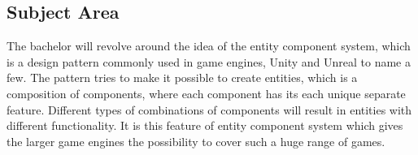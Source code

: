 \subsection{Subject Area}
The bachelor will revolve around the idea of the entity component system, which is a design pattern commonly used in game engines, Unity and Unreal to name a few. 
The pattern tries to make it possible to create entities, which is a composition of components, where each component has its each unique separate feature. 
Different types of combinations of components will result in entities with different functionality. 
It is this feature of entity component system which gives the larger game engines the possibility to cover such a huge range of games.
